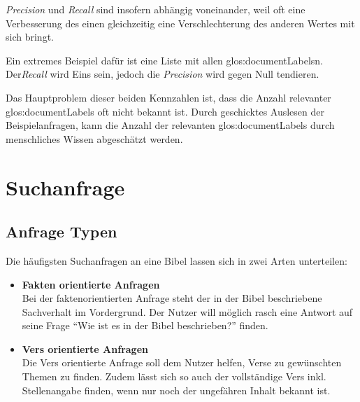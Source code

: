 \textit{Precision} und \textit{Recall} sind insofern abhängig voneinander, weil oft eine Verbesserung des einen gleichzeitig eine Verschlechterung des anderen Wertes mit sich bringt.

Ein extremes Beispiel dafür ist eine Liste mit allen \glspl{glos:documentLabel}n. Der\textit{Recall} wird Eins sein, jedoch die \textit{Precision} wird gegen Null tendieren.

Das Hauptproblem dieser beiden Kennzahlen ist, dass die Anzahl relevanter \glspl{glos:documentLabel} oft nicht bekannt ist. 
Durch geschicktes Auslesen der Beispielanfragen, kann die Anzahl der relevanten \glspl{glos:documentLabel} durch menschliches Wissen abgeschätzt werden.



\section{Suchanfrage}

\subsection{Anfrage Typen}
Die häufigsten Suchanfragen an eine Bibel lassen sich in zwei Arten unterteilen:
\begin{itemize}[noitemsep]
	\item \textbf{Fakten orientierte Anfragen}\\
		Bei der faktenorientierten Anfrage steht der in der Bibel beschriebene Sachverhalt im Vordergrund. Der Nutzer will möglich rasch eine Antwort auf seine Frage "`Wie ist es in der Bibel beschrieben?"' finden.
		
	\item \textbf{Vers orientierte Anfragen}\\
		Die Vers orientierte Anfrage soll dem Nutzer helfen, Verse zu gewünschten Themen zu finden.
		Zudem lässt sich so auch der vollständige Vers inkl. Stellenangabe finden, wenn nur noch der ungefähren Inhalt bekannt ist.
		
\end{itemize}



